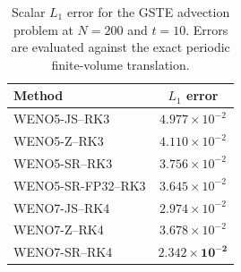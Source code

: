 \begin{table}[H]
\centering
\caption{Scalar $L_1$ error for the GSTE advection problem at $N=200$ and
$t=10$.  Errors are evaluated against the exact periodic finite-volume
translation.}
\label{tab:gste_l1_weno_z}
\small
\begin{tabular}{lc}
\toprule
Method & $L_1$ error \\
\midrule
WENO5-JS--RK3      & $4.977\times10^{-2}$ \\
WENO5-Z--RK3       & $4.110\times10^{-2}$ \\
WENO5-SR--RK3      & $3.756\times10^{-2}$ \\
WENO5-SR-FP32--RK3 & $3.645\times10^{-2}$ \\
WENO7-JS--RK4      & $2.974\times10^{-2}$ \\
WENO7-Z--RK4       & $3.678\times10^{-2}$ \\
WENO7-SR--RK4      & $\mathbf{2.342\times10^{-2}}$ \\
\bottomrule
\end{tabular}
\end{table}
